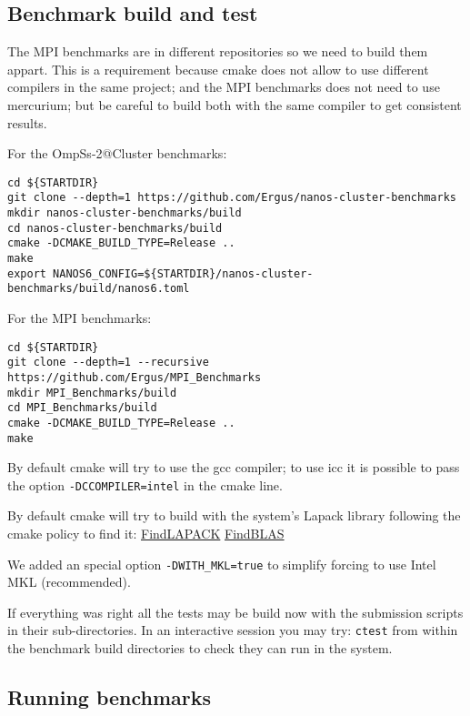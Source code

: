 \documentclass{article}
\newcommand{\code}[1]{\texttt{#1}}
\begin{document}
\subsection{Benchmark build and test}

The MPI benchmarks are in different repositories so we need to build
them appart. This is a requirement because cmake does not allow to use
different compilers in the same project; and the MPI benchmarks does
not need to use mercurium; but be careful to build both with the same
compiler to get consistent results.

For the OmpSs-2@Cluster benchmarks:

\begin{lstlisting}
cd ${STARTDIR}
git clone --depth=1 https://github.com/Ergus/nanos-cluster-benchmarks
mkdir nanos-cluster-benchmarks/build
cd nanos-cluster-benchmarks/build
cmake -DCMAKE_BUILD_TYPE=Release ..
make
export NANOS6_CONFIG=${STARTDIR}/nanos-cluster-benchmarks/build/nanos6.toml
\end{lstlisting}

For the MPI benchmarks:

\begin{lstlisting}
cd ${STARTDIR}
git clone --depth=1 --recursive https://github.com/Ergus/MPI_Benchmarks
mkdir MPI_Benchmarks/build
cd MPI_Benchmarks/build
cmake -DCMAKE_BUILD_TYPE=Release ..
make
\end{lstlisting}

By default cmake will try to use the gcc compiler; to use icc it is
possible to pass the option \code{-DCCOMPILER=intel} in the cmake
line.

By default cmake will try to build with the system's Lapack library
following the cmake policy to find it:
\href{https://cmake.org/cmake/help/latest/module/FindLAPACK.html}{FindLAPACK}
\href{https://cmake.org/cmake/help/latest/module/FindBLAS.html}{FindBLAS}

We added an special option \code{-DWITH\_MKL=true} to simplify forcing
to use Intel MKL (recommended).

If everything was right all the tests may be build now with the
submission scripts in their sub-directories. In an interactive session
you may try: \code{ctest} from within the benchmark build directories
to check they can run in the system.

\subsection{Running benchmarks}
\end{document}
